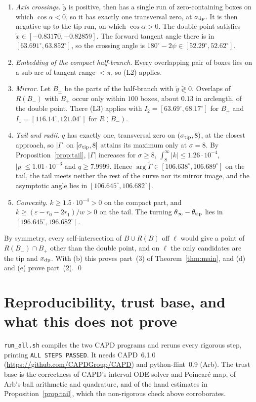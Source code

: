 \documentclass[11pt]{amsart}
\theoremstyle{remark}
\newcommand{\eps}{\varepsilon}
\begin{document}
\begin{enumerate}
\item[(a)] \emph{Axis crossings.} $\tilde y$ is positive, then has a single run of zero-containing boxes on which $\cos\alpha<0$, so it has exactly one transversal zero, at $\sigma_{\rm dp}$. It is then negative up to the tip run, on which $\cos\alpha>0$. The double point satisfies $\tilde x\in[-0.83170,-0.82859]$. The forward tangent angle there is in $[63.691^\circ,63.852^\circ]$, so the crossing angle is $180^\circ-2\psi\in[52.29^\circ,52.62^\circ]$.
\item[(b)] \emph{Embedding of the compact half-branch.} Every overlapping pair of boxes lies on a sub-arc of tangent range $<\pi$, so (L2) applies.
\item[(c)] \emph{Mirror.} Let $B_\pm$ be the parts of the half-branch with $\tilde y\gtrless0$. Overlaps of $R(B_-)$ with $B_+$ occur only within $100$ boxes, about $0.13$ in arclength, of the double point. There (L3) applies with $I_2=[63.69^\circ,68.17^\circ]$ for $B_+$ and $I_1=[116.14^\circ,121.04^\circ]$ for $R(B_-)$.
\item[(d)] \emph{Tail and radii.} $q$ has exactly one, transversal zero on $(\sigma_{\rm tip},8)$, at the closest approach, so $|\Gamma|$ on $[\sigma_{\rm tip},8]$ attains its maximum only at $\sigma=8$. By Proposition~\ref{prop:tail}, $|\Gamma|$ increases for $\sigma\ge8$, $\int_8^\infty|k|\le1.26\cdot10^{-4}$, $|p|\le1.01\cdot10^{-3}$ and $q\ge7.9999$. Hence $\arg\tilde\Gamma\in[106.638^\circ,106.689^\circ]$ on the tail, the tail meets neither the rest of the curve nor its mirror image, and the asymptotic angle lies in $[106.645^\circ,106.682^\circ]$.
\item[(e)] \emph{Convexity.} $k\ge1.5\cdot10^{-4}>0$ on the compact part, and $k\ge(\eps-r_0-2r_1)/w>0$ on the tail. The turning $\theta_\infty-\theta_{\rm tip}$ lies in $[196.645^\circ,196.682^\circ]$.
\end{enumerate}
By symmetry, every self-intersection of $B\cup R(B)$ off $\ell$ would give a point of $R(B_-)\cap B_+$ other than the double point, and on $\ell$ the only candidates are the tip and $x_{\rm dp}$. With (b) this proves part~(3) of Theorem~\ref{thm:main}, and (d) and (e) prove part~(2). \qed

\section{Reproducibility, trust base, and what this does not prove}
\texttt{run\_all.sh} compiles the two CAPD programs and reruns every rigorous step, printing \texttt{ALL STEPS PASSED}. It needs CAPD~6.1.0 (\url{https://github.com/CAPDGroup/CAPD}) and python-flint~0.9 (Arb). The trust base is the correctness of CAPD's interval ODE solver and Poincar\'e map, of Arb's ball arithmetic and quadrature, and of the hand estimates in Proposition~\ref{prop:tail}, which the non-rigorous check above corroborates.
\end{document}
